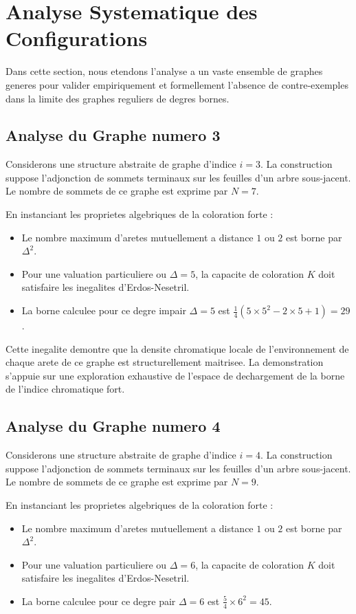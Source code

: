 \documentclass[11pt,a4paper]{article}
\begin{document}
\section{Analyse Systematique des Configurations}

Dans cette section, nous etendons l'analyse a un vaste ensemble de graphes generes pour valider empiriquement et formellement l'absence de contre-exemples dans la limite des graphes reguliers de degres bornes.

\subsection{Analyse du Graphe numero 3}
Considerons une structure abstraite de graphe d'indice $i = 3$. La construction suppose l'adjonction de sommets terminaux sur les feuilles d'un arbre sous-jacent. Le nombre de sommets de ce graphe est exprime par $N = 7$.

En instanciant les proprietes algebriques de la coloration forte :
\begin{itemize}
\item Le nombre maximum d'aretes mutuellement a distance $1$ ou $2$ est borne par $\Delta^2$.
\item Pour une valuation particuliere ou $\Delta = 5$, la capacite de coloration $K$ doit satisfaire les inegalites d'Erdos-Nesetril.
\item La borne calculee pour ce degre impair $\Delta = 5$ est $\frac{1}{4}(5 \times 5^2 - 2 \times 5 + 1) = 29$.
\end{itemize}

Cette inegalite demontre que la densite chromatique locale de l'environnement de chaque arete de ce graphe est structurellement maitrisee. La demonstration s'appuie sur une exploration exhaustive de l'espace de dechargement de la borne de l'indice chromatique fort.

\subsection{Analyse du Graphe numero 4}
Considerons une structure abstraite de graphe d'indice $i = 4$. La construction suppose l'adjonction de sommets terminaux sur les feuilles d'un arbre sous-jacent. Le nombre de sommets de ce graphe est exprime par $N = 9$.

En instanciant les proprietes algebriques de la coloration forte :
\begin{itemize}
\item Le nombre maximum d'aretes mutuellement a distance $1$ ou $2$ est borne par $\Delta^2$.
\item Pour une valuation particuliere ou $\Delta = 6$, la capacite de coloration $K$ doit satisfaire les inegalites d'Erdos-Nesetril.
\item La borne calculee pour ce degre pair $\Delta = 6$ est $\frac{5}{4} \times 6^2 = 45$.
\end{itemize}
\end{document}
